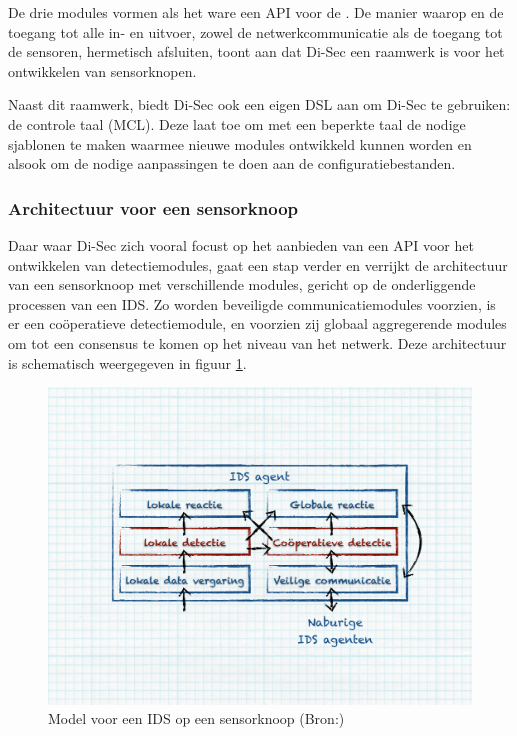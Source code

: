 De drie modules vormen als het ware een API voor de . De manier
waarop  en  de toegang tot alle in- en uitvoer, zowel de
netwerkcommunicatie als de toegang tot de sensoren, hermetisch afsluiten, toont
aan dat Di-Sec een raamwerk is voor het ontwikkelen van sensorknopen.

Naast dit raamwerk, biedt Di-Sec ook een eigen DSL aan om Di-Sec te gebruiken:
de  controle taal (MCL). Deze laat toe om met een beperkte taal de
nodige sjablonen te maken waarmee nieuwe modules ontwikkeld kunnen worden en
alsook om de nodige aanpassingen te doen aan de configuratiebestanden.

\subsubsection*{Architectuur voor een sensorknoop}
\label{subsubsection:node-architecture}

Daar waar Di-Sec zich vooral focust op het aanbieden van een API voor het
ontwikkelen van detectiemodules, gaat \citep{zhang2000intrusion} een stap
verder en verrijkt de architectuur van een sensorknoop met verschillende
modules, gericht op de onderliggende processen van een IDS. Zo worden
beveiligde communicatiemodules voorzien, is er een co\"operatieve
detectiemodule, en voorzien zij globaal aggregerende modules om tot een
consensus te komen op het niveau van het netwerk. Deze architectuur is
schematisch weergegeven in figuur \ref{fig:node-architecture}.

\begin{figure}[ht]
  \centering
  \includegraphics[width=0.9\linewidth]{resources/node-architecture.pdf}
  \caption[Model voor een IDS op een sensorknoop]{Model voor een IDS op een
  sensorknoop (Bron:\citep{zhang2000intrusion})}
  \label{fig:node-architecture}
\end{figure}

